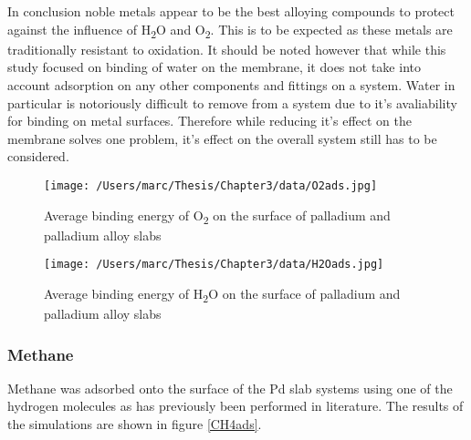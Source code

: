 In conclusion noble metals appear to be the best alloying compounds to protect against the influence of H\textsubscript{2}O and O\textsubscript{2}. This is to be expected as these metals are traditionally resistant to oxidation. It should be noted however that while this study focused on binding of water on the membrane, it does not take into account adsorption on any other components and fittings on a system. Water in particular is notoriously difficult to remove from a system due to it's avaliability for binding on metal surfaces.\cite{BACQUART20205565} Therefore while reducing it's effect on the membrane solves one problem, it's effect on the overall system still has to be considered. 

\begin{landscape}
  \begin{figure}
      \centering
      \texttt{[image: /Users/marc/Thesis/Chapter3/data/O2ads.jpg]}
      \caption{Average binding energy of O\textsubscript{2} on the surface of palladium and palladium alloy slabs}
      \label{O2ads}
    \end{figure}
  
  \end{landscape}


\begin{landscape}
  \begin{figure}
      \centering
      \texttt{[image: /Users/marc/Thesis/Chapter3/data/H2Oads.jpg]}
      \caption{Average binding energy of H\textsubscript{2}O on the surface of palladium and palladium alloy slabs}
      \label{H2Oads}
    \end{figure}
  
  \end{landscape}

\subsubsection{Methane}

Methane was adsorbed onto the surface of the Pd slab systems using one of the hydrogen molecules as has previously been performed in literature. \cite{doi:10.1021/acsomega.8b02578} The results of the simulations are shown in figure \ref{CH4ads}. 

